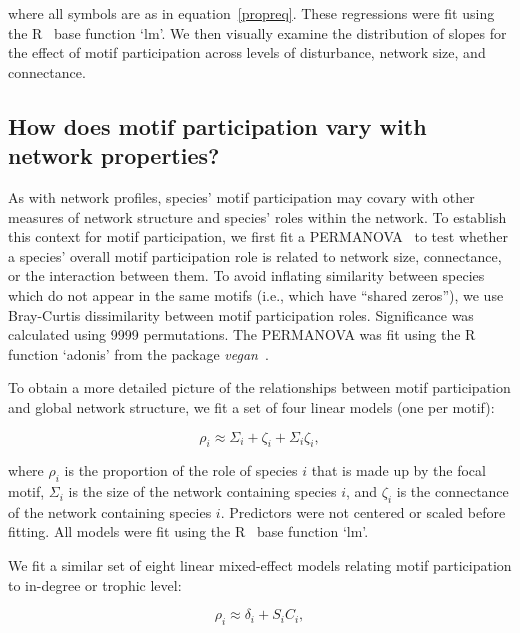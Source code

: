 \documentclass[12pt]{article}
\begin{document}
\begin{spacing}{2.0}
        where all symbols are as in equation~\ref{propreq}.
        These regressions were fit using the R~\citep{R} base function `lm'.
        We then visually examine the distribution of slopes for the effect of motif participation across levels of disturbance, network size, and connectance. 


    \subsection{How does motif participation vary with network properties?}

        As with network profiles, species' motif participation may covary with other measures of network structure and species' roles within the network.
        To establish this context for motif participation, we first fit a PERMANOVA~\citep{Anderson2001} to test whether a species' overall motif participation role is related to network size, connectance, or the interaction between them.
        To avoid inflating similarity between species which do not appear in the same motifs (i.e., which have ``shared zeros''), we use Bray-Curtis dissimilarity between motif participation roles.
        Significance was calculated using 9999 permutations.
        The PERMANOVA was fit using the R~\citep{R} function `adonis' from the package \emph{vegan}~\citep{vegan}.


        To obtain a more detailed picture of the relationships between motif participation and global network structure, we fit a set of four linear models (one per motif):


        \begin{equation}
            \rho_{i} \approx \Sigma_{i} + \zeta_{i} + \Sigma_{i}\zeta_{i} ,
            \label{partic_SC}
        \end{equation}
        
        where $\rho_{i}$ is the proportion of the role of species $i$ that is made up by the focal motif,
        $\Sigma_{i}$ is the size of the network containing species $i$, and $\zeta_{i}$ is the connectance of the network containing species $i$.
        Predictors were not centered or scaled before fitting.
        All models were fit using the R~\citep{R} base function `lm'.


        We fit a similar set of eight linear mixed-effect models relating motif participation to in-degree or trophic level:
        
        \begin{equation}
            \rho_{i} \approx \delta_{i} + S_{i}C_{i} ,
            \label{partic_deg}
        \end{equation}


\end{spacing}
\end{document}
